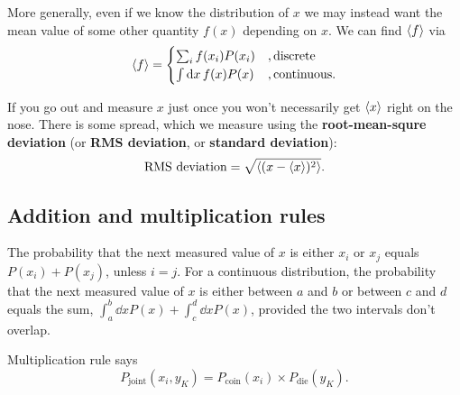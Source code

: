 More generally, even if we know the distribution of $ x $ we may instead want the mean value of some other quantity $f(x)$ depending on $x$. We can find $\expval{f}$ via
\begin{equation}
	\expval{f} = \begin{cases}
		\sum_i f(x_i) P(x_i) &, \text{discrete}\\
		\int \dd{x} f(x)P(x) &, \text{continuous.}
	\end{cases}
\end{equation}

If you go out and measure $x$ just once you won't necessarily get $\expval{x}$ right on the nose. There is some spread, which we measure using the \textbf{root-mean-squre deviation} (or \textbf{RMS deviation}, or \textbf{standard deviation}):
\begin{equation}
	\text{RMS deviation} = \sqrt{\expval{(x - \expval{x})^2}}.
\end{equation}

\subsection{Addition and multiplication rules}
 The probability that the next measured value of $x$ is either $x_i$ or $x_j$ equals $P(x_i) + P(x_j)$, unless $i=j$. For a continuous distribution, the probability that the next measured value of $x$ is either between $a$ and $b$ or between $c$ and $d$ equals the sum, $ \int_{a}^{b}\dd{x}P(x) + \int_{c}^{d}\dd{x}P(x) $, provided the two intervals don't overlap.

 Multiplication rule says
\begin{equation}
	P_\mathrm{joint}(x_i, y_K) = P_\mathrm{coin}(x_i) \times P_\mathrm{die}(y_K).
\end{equation}


